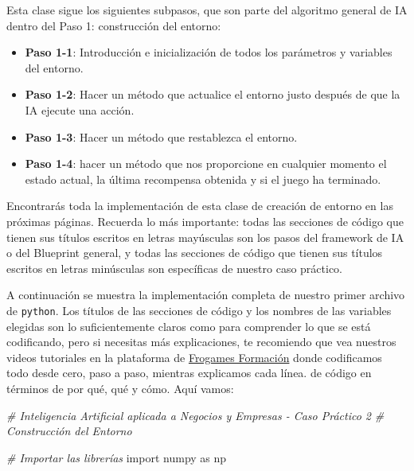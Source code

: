 \documentclass[
]{book}
\newenvironment{Shaded}{\begin{snugshade}}{\end{snugshade}}
\newcommand{\CommentTok}[1]{\textcolor[rgb]{0.56,0.35,0.01}{\textit{#1}}}
\newcommand{\ImportTok}[1]{#1}
\newcommand{\NormalTok}[1]{#1}
\providecommand{\tightlist}{%
  \setlength{\itemsep}{0pt}\setlength{\parskip}{0pt}}
\begin{document}
Esta clase sigue los siguientes subpasos, que son parte del algoritmo general de IA dentro del Paso 1: construcción del entorno:

\begin{itemize}
\tightlist
\item
  \textbf{Paso 1-1}: Introducción e inicialización de todos los parámetros y variables del entorno.
\item
  \textbf{Paso 1-2}: Hacer un método que actualice el entorno justo después de que la IA ejecute una acción.
\item
  \textbf{Paso 1-3}: Hacer un método que restablezca el entorno.
\item
  \textbf{Paso 1-4}: hacer un método que nos proporcione en cualquier momento el estado actual, la última recompensa obtenida y si el juego ha terminado.
\end{itemize}

Encontrarás toda la implementación de esta clase de creación de entorno en las próximas páginas. Recuerda lo más importante: todas las secciones de código que tienen sus títulos escritos en letras mayúsculas son los pasos del framework de IA o del Blueprint general, y todas las secciones de código que tienen sus títulos escritos en letras minúsculas son específicas de nuestro caso práctico.

A continuación se muestra la implementación completa de nuestro primer archivo de \texttt{python}. Los títulos de las secciones de código y los nombres de las variables elegidas son lo suficientemente claros como para comprender lo que se está codificando, pero si necesitas más explicaciones, te recomiendo que vea nuestros videos tutoriales en la plataforma de \href{https://cursos.frogamesformacion.com/courses/ia-aplicada-negocios?et=paid\&ref=846b3f\&coupon=frogames30}{Frogames Formación} donde codificamos todo desde cero, paso a paso, mientras explicamos cada línea. de código en términos de por qué, qué y cómo. Aquí vamos:

\begin{Shaded}
\begin{Highlighting}[]
\CommentTok{\# Inteligencia Artificial aplicada a Negocios y Empresas {-} Caso Práctico 2}
\CommentTok{\# Construcción del Entorno}

\CommentTok{\# Importar las librerías}
\ImportTok{import}\NormalTok{ numpy }\ImportTok{as}\NormalTok{ np}
\end{Highlighting}
\end{Shaded}
\end{document}
